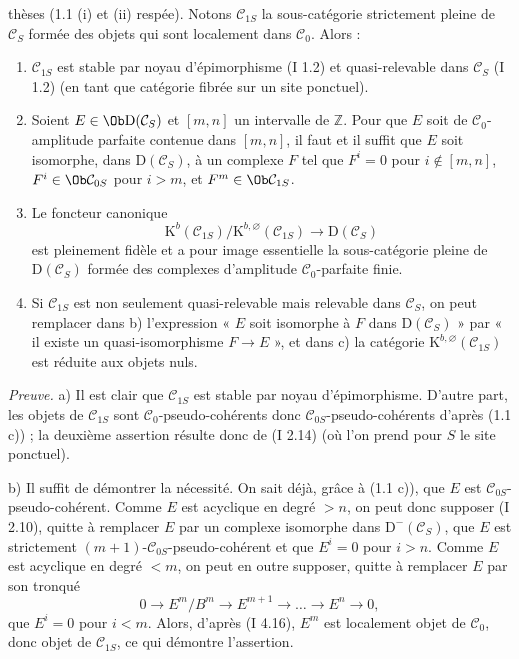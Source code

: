 thèses (1.1 (i) et (ii)
respée). Notons $\mathcal C_{1S}$ la sous-catégorie strictement pleine de $\mathcal C_S$ formée des objets qui sont localement dans $\mathcal C_0$. Alors :
\begin{enumerate}[label=\alph*)]
\item $\mathcal C_{1S}$ est stable par noyau d'épimorphisme (I 1.2) et quasi-relevable dans $\mathcal C_S$ (I 1.2) (en tant que catégorie fibrée sur un site ponctuel).
\item Soient $E\in\Ob\mathrm D(\mathcal C_S)$ et $[m,n]$ un intervalle de $\mathbb Z$. Pour que $E$ soit de $\mathcal C_0$-amplitude parfaite contenue dans $[m,n]$, il faut et il suffit que $E$ soit isomorphe, dans $\mathrm D(\mathcal C_S)$, à un complexe $F$ tel que $F^i=0$ pour $i\notin[m,n]$, $F^i\in\Ob\mathcal C_{0S}$ pour $i>m$, et $F^m\in\Ob\mathcal C_{1S}$.
\item Le foncteur canonique
\[
\mathrm K^b(\mathcal C_{1S})/\mathrm K^{b,\varnothing}(\mathcal C_{1S})
\longrightarrow \mathrm D(\mathcal C_S)
\]
est pleinement fidèle et a pour image essentielle la sous-catégorie pleine de $\mathrm D(\mathcal C_S)$ formée des complexes d'amplitude $\mathcal C_0$-parfaite finie.
\item Si $\mathcal C_{1S}$ est non seulement quasi-relevable mais relevable dans $\mathcal C_S$, on peut remplacer dans b) l'expression « $E$ soit isomorphe à $F$ dans $\mathrm D(\mathcal C_S)$ » par « il existe un quasi-isomorphisme $F\to E$ », et dans c) la catégorie $\mathrm K^{b,\varnothing}(\mathcal C_{1S})$ est réduite aux objets nuls.
\end{enumerate}

\emph{Preuve.} a) Il est clair que $\mathcal C_{1S}$ est stable par noyau d'épimorphisme. D'autre part, les objets de $\mathcal C_{1S}$ sont $\mathcal C_0$-pseudo-cohérents donc $\mathcal C_{0S}$-pseudo-cohérents d'après (1.1 c)) ; la deuxième assertion résulte donc de (I 2.14) (où l'on prend pour $S$ le site ponctuel).

b) Il suffit de démontrer la nécessité. On sait déjà, grâce à (1.1 c)), que $E$ est $\mathcal C_{0S}$-pseudo-cohérent. Comme $E$ est acyclique en degré $>n$, on peut donc supposer (I 2.10), quitte à remplacer $E$ par un complexe isomorphe dans $\mathrm D^{-}(\mathcal C_S)$, que $E$ est strictement $(m+1)$-$\mathcal C_{0S}$-pseudo-cohérent et que $E^i=0$ pour $i>n$. Comme $E$ est acyclique en degré $<m$, on peut en outre supposer, quitte à remplacer $E$ par son tronqué
\[
0\longrightarrow E^m/B^m\longrightarrow E^{m+1}\longrightarrow\ldots\longrightarrow E^n\longrightarrow0,
\]
que $E^i=0$ pour $i<m$. Alors, d'après (I 4.16), $E^m$ est localement objet de $\mathcal C_0$, donc objet de $\mathcal C_{1S}$, ce qui démontre l'assertion.

